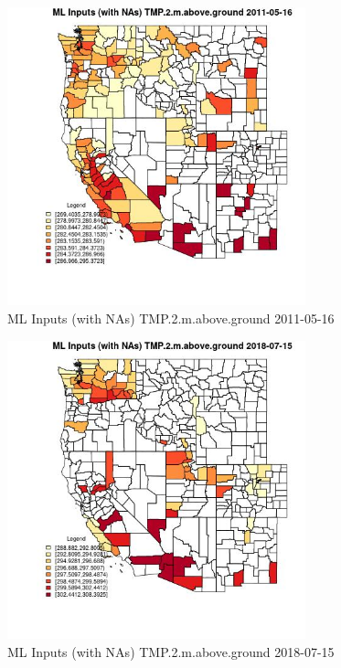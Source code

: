 \begin{figure} 
\centering  
\includegraphics[width=0.77\textwidth]{Code_Outputs/Report_ML_input_PM25_Step4_part_e_de_duplicated_aves_compiled_2019-05-20wNAs_CountyTMP2mabovegroundMean2011-05-16.jpg} 
\caption{\label{fig:Report_ML_input_PM25_Step4_part_e_de_duplicated_aves_compiled_2019-05-20wNAsCountyTMP2mabovegroundMean2011-05-16}ML Inputs (with NAs) TMP.2.m.above.ground 2011-05-16} 
\end{figure} 
 

\begin{figure} 
\centering  
\includegraphics[width=0.77\textwidth]{Code_Outputs/Report_ML_input_PM25_Step4_part_e_de_duplicated_aves_compiled_2019-05-20wNAs_CountyTMP2mabovegroundMean2018-07-15.jpg} 
\caption{\label{fig:Report_ML_input_PM25_Step4_part_e_de_duplicated_aves_compiled_2019-05-20wNAsCountyTMP2mabovegroundMean2018-07-15}ML Inputs (with NAs) TMP.2.m.above.ground 2018-07-15} 
\end{figure} 
 

